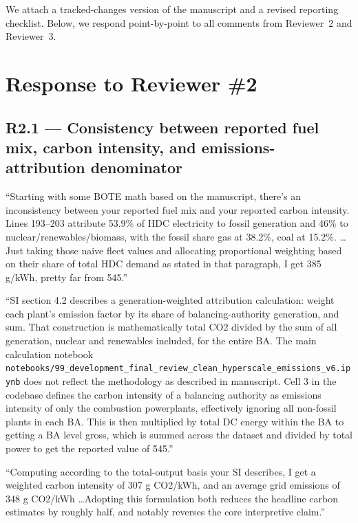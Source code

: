 \documentclass[11pt]{article}
\newenvironment{revquote}{%
  \begin{mdframed}[
    leftmargin=0.5em,
    rightmargin=0.5em,
    linewidth=0pt,
    backgroundcolor=gray!8,
    skipabove=0.5em,
    skipbelow=0.5em,
    innertopmargin=0.6em,
    innerbottommargin=0.6em,
    innerleftmargin=0.8em,
    innerrightmargin=0.8em
  ]%
  \itshape%
}{%
  \end{mdframed}%
}
\begin{document}
We attach a tracked-changes version of the manuscript and a revised reporting checklist. Below, we respond point-by-point to all comments from Reviewer~2 and Reviewer~3.

\bigskip

\section*{Response to Reviewer \#2}

\subsection*{R2.1 --- Consistency between reported fuel mix, carbon intensity, and emissions-attribution denominator}

\begin{revquote}
``Starting with some BOTE math based on the manuscript, there's an inconsistency between your reported fuel mix and your reported carbon intensity. Lines 193--203 attribute 53.9\% of HDC electricity to fossil generation and 46\% to nuclear/renewables/biomass, with the fossil share gas at 38.2\%, coal at 15.2\%. \ldots Just taking those naive fleet values and allocating proportional weighting based on their share of total HDC demand as stated in that paragraph, I get 385 g/kWh, pretty far from 545.''

\medskip

``SI section 4.2 describes a generation-weighted attribution calculation: weight each plant's emission factor by its share of balancing-authority generation, and sum. That construction is mathematically total CO2 divided by the sum of all generation, nuclear and renewables included, for the entire BA. The main calculation notebook \texttt{notebooks/99\_development\_final\_review\_clean\_hyperscale\_emissions\_v6.ipynb} does not reflect the methodology as described in manuscript. Cell 3 in the codebase defines the carbon intensity of a balancing authority as emissions intensity of only the combustion powerplants, effectively ignoring all non-fossil plants in each BA. This is then multiplied by total DC energy within the BA to getting a BA level gross, which is summed across the dataset and divided by total power to get the reported value of 545.''

\medskip

``Computing according to the total-output basis your SI describes, I get a weighted carbon intensity of 307 g CO2/kWh, and an average grid emissions of 348 g CO2/kWh \ldots Adopting this formulation both reduces the headline carbon estimates by roughly half, and notably reverses the core interpretive claim.''
\end{revquote}
\end{document}
